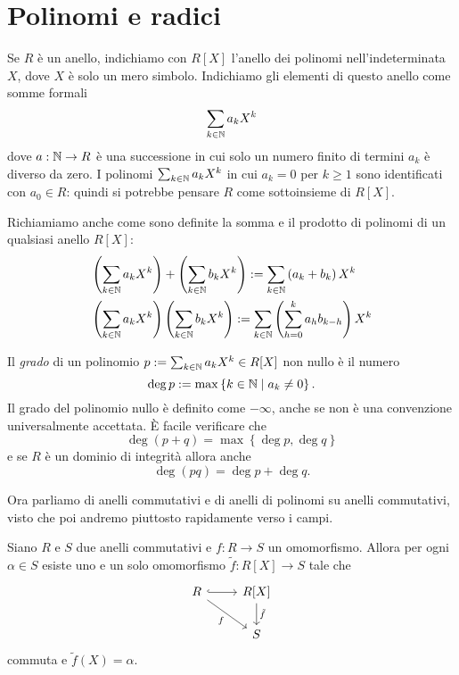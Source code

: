 
\section{Polinomi e radici}

Se \(R\) è un anello, indichiamo con \(R[X]\) l'anello dei polinomi nell'indeterminata \(X\), dove \(X\) è solo un mero simbolo. Indichiamo gli elementi di questo anello come somme formali
\[\sum_{k \in \mathbb{N}} a_k X^k\]
dove \(a : \mathbb{N} \to R\) è una successione in cui solo un numero finito di termini \(a_k\) è diverso da zero. I polinomi \(\sum_{k \in \mathbb{N}} a_k X^k\) in cui \(a_k = 0\) per \(k \ge 1\) sono identificati con \(a_0 \in R\): quindi si potrebbe pensare \(R\) come sottoinsieme di \(R[X]\).

Richiamiamo anche come sono definite la somma e il prodotto di polinomi di un qualsiasi anello \(R[X]\):%
\begin{align*}
& \left(\sum_{k \in \mathbb{N}} a_k X^k\right) + \left(\sum_{k \in \mathbb{N}} b_k X^k\right) := \sum_{k \in \mathbb{N}} \left(a_k+b_k\right) X^k \\
& \left(\sum_{k \in \mathbb{N}} a_k X^k\right) \left(\sum_{k \in \mathbb{N}} b_k X^k\right) := \sum_{k \in \mathbb{N}} \left(\sum_{h=0}^k a_h b_{k-h}\right) X^k
\end{align*}

Il {\em grado} di un polinomio \(p := \sum_{k \in \mathbb{N}} a_k X^k \in R[X]\) non nullo è il numero
\[\deg p := \max \left\{k \in \mathbb{N} \mid a_k \ne 0 \right\} .\]
Il grado del polinomio nullo è definito come \(-\infty\), anche se non è una convenzione universalmente accettata. È facile verificare che
\[\deg(p + q) = \max\left\{ \deg p, \deg q \right\}\]
e se \(R\) è un dominio di integrità allora anche
\[\deg(pq) = \deg p + \deg q .\]

Ora parliamo di anelli commutativi e di anelli di polinomi su anelli commutativi, visto che poi andremo piuttosto rapidamente verso i campi.

\begin{prop}\label{prop:OmomorfismiDaAnelliPolinomi}
Siano \(R\) e \(S\) due anelli commutativi e \(f : R \to S\) un omomorfismo. Allora per ogni \(\alpha \in S\) esiste uno e un solo omomorfismo \(\tilde f : R[X] \to S\) tale che
\[\begin{tikzcd}
R \ar["f", dr, swap] \ar[hookrightarrow, r] & R[X] \ar["{\tilde f}", d] \\
                                            & S
\end{tikzcd}\]
commuta e \(\tilde f (X) = \alpha\).
\end{prop}


